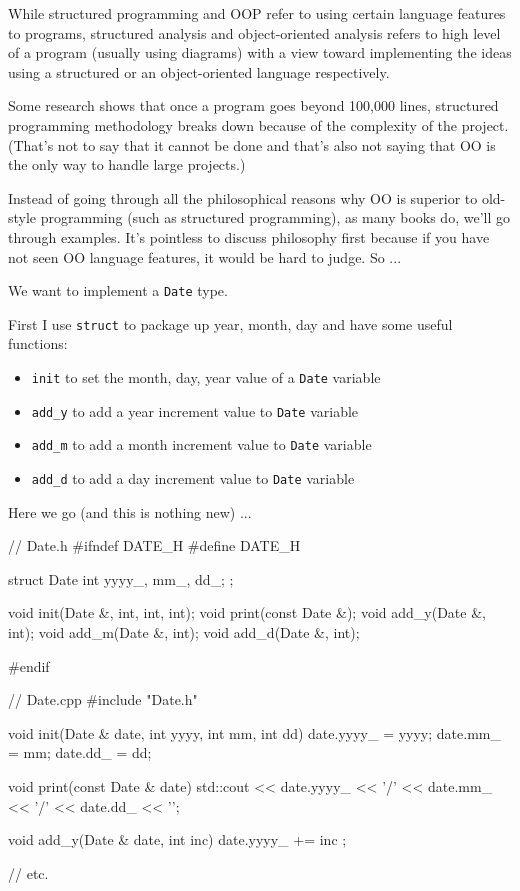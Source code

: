 While structured programming and OOP refer to using certain language
features to  programs, structured analysis and
object-oriented analysis refers to high level  of a
program (usually using diagrams) with a view toward implementing the
ideas using a structured or an object-oriented language respectively.

Some research shows that once a program goes beyond 100,000 lines,
structured programming methodology breaks down because of the complexity
of the project. (That's not to say that it cannot be
done and that's also not saying that OO is the only way
to handle large projects.)

Instead of going through all the philosophical reasons why OO is
superior to old-style programming (such as structured programming), as
many books do, we'll go through examples. It's pointless
to discuss philosophy first because if you have not seen OO language
features, it would be hard to judge. So ...


\newpage{}

We want to implement a \texttt{Date} type.

First I use \texttt{struct} to package up year, month, day and have some
useful functions:

\begin{itemize}
\item \texttt{init} to set the month, day, year value of a \texttt{Date}
  variable
\item \texttt{add\_y} to add a year increment value to \texttt{Date} variable
\item \texttt{add\_m} to add a month increment value to \texttt{Date} variable
\item \texttt{add\_d} to add a day increment value to \texttt{Date} variable
\end{itemize}

Here we go (and this is nothing new) ...

\begin{consolethree}[escapeinside=||]
// Date.h
#ifndef DATE_H
#define DATE_H

struct Date
{
    int yyyy_, mm_, dd_;
};

void init(Date &, int, int, int);
void print(const Date &);
void add_y(Date &, int);
void add_m(Date &, int);
void add_d(Date &, int);

#endif
\end{consolethree}

\begin{consolethree}[escapeinside=||]
// Date.cpp
#include "Date.h"

void init(Date & date, int yyyy, int mm, int dd)
{
    date.yyyy_ = yyyy;
    date.mm_ = mm;
    date.dd_ = dd;
}

void print(const Date & date)
{
    std::cout << date.yyyy_ << '/'
              << date.mm_ << '/'
              << date.dd_ << '\n';
}

void add_y(Date & date, int inc)
{
    date.yyyy_ += inc ;
}

// etc.
\end{consolethree}

